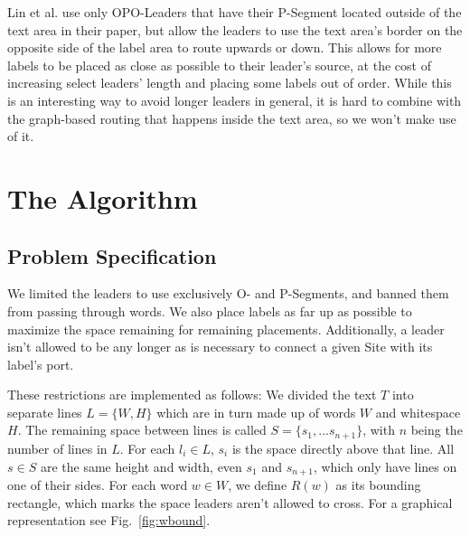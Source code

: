 \documentclass[11pt,a4paper]{vutinfth}
\begin{document}
Lin et al.\cite{Lin2009} use only OPO-Leaders that have their P-Segment located outside of the text area in their paper, but allow the leaders to use the text area's border on the opposite side of the label area to route upwards or down. This allows for more labels to be placed as close as possible to their leader's source, at the cost of increasing select leaders' length and placing some labels out of order. While this is an interesting way to avoid longer leaders in general, it is hard to combine with the graph-based routing that happens inside the text area, so we won't make use of it.


\chapter{The Algorithm}
\section{Problem Specification}
\label{sec:ProbSpec}
We limited the leaders to use exclusively O- and P-Segments, and banned them from passing through words. We also place labels as far up as possible to maximize the space remaining for  remaining placements. Additionally, a leader isn't allowed to be any longer as is necessary to connect a given Site with its label's port.

These restrictions are implemented as follows: We divided the text $T$ into separate lines $L=\{W,H\}$ which are in turn made up of words $W$ and whitespace $H$. The remaining space between lines is called $S=\{s_1, ... s_{n+1}\}$, with $n$ being the number of lines in $L$. For each $l_i \in L$,  $s_i$ is the space directly above that line. All $s \in S$ are the same height and width, even $s_1$ and $s_{n+1}$, which only have lines on one of their sides. For each word $w \in W$, we define $R(w)$  as its bounding rectangle, which marks the space leaders aren't allowed to cross. For a graphical representation see Fig.~\ref{fig:wbound}.
\end{document}
